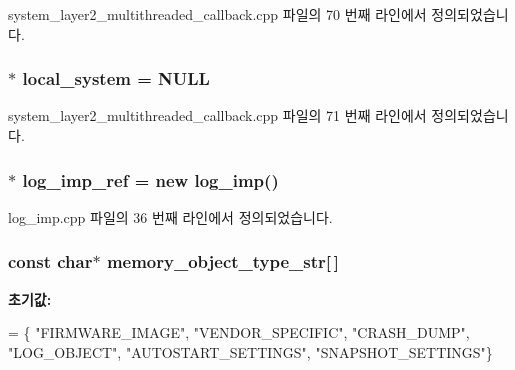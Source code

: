 system\+\_\+layer2\+\_\+multithreaded\+\_\+callback.\+cpp 파일의 70 번째 라인에서 정의되었습니다.

\subsubsection[{\texorpdfstring{local\+\_\+system}{local_system}}]{ $\ast$ local\+\_\+system = {\bf N\+U\+LL}}\hypertarget{namespaceavdecc__lib_ac8524539181fa62deed358df4dcf507c}{}\label{namespaceavdecc__lib_ac8524539181fa62deed358df4dcf507c}


system\+\_\+layer2\+\_\+multithreaded\+\_\+callback.\+cpp 파일의 71 번째 라인에서 정의되었습니다.

\subsubsection[{\texorpdfstring{log\+\_\+imp\+\_\+ref}{log_imp_ref}}]{ $\ast$ log\+\_\+imp\+\_\+ref = new {\bf log\+\_\+imp}()}\hypertarget{namespaceavdecc__lib_acbe3e2a96ae6524943ca532c87a28529}{}\label{namespaceavdecc__lib_acbe3e2a96ae6524943ca532c87a28529}


log\+\_\+imp.\+cpp 파일의 36 번째 라인에서 정의되었습니다.

\subsubsection[{\texorpdfstring{memory\+\_\+object\+\_\+type\+\_\+str}{memory_object_type_str}}]{\setlength{\rightskip}{0pt plus 5cm}const char$\ast$ memory\+\_\+object\+\_\+type\+\_\+str\mbox{[}$\,$\mbox{]}}\hypertarget{namespaceavdecc__lib_a46dd51611fc0c91e9fa3943bf87024f7}{}\label{namespaceavdecc__lib_a46dd51611fc0c91e9fa3943bf87024f7}
{\bfseries 초기값\+:}
\begin{DoxyCode}
=
    \{
        \textcolor{stringliteral}{"FIRMWARE\_IMAGE"},
        \textcolor{stringliteral}{"VENDOR\_SPECIFIC"},
        \textcolor{stringliteral}{"CRASH\_DUMP"},
        \textcolor{stringliteral}{"LOG\_OBJECT"},
        \textcolor{stringliteral}{"AUTOSTART\_SETTINGS"},
        \textcolor{stringliteral}{"SNAPSHOT\_SETTINGS"}\}
\end{DoxyCode}


